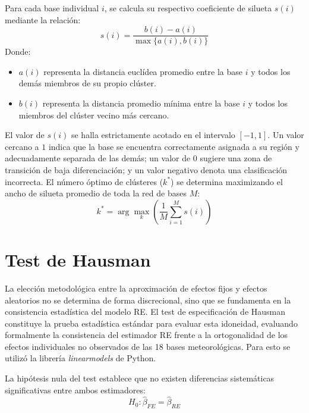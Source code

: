Para cada base individual $i$, se calcula su respectivo coeficiente de silueta $s(i)$ mediante la relación:
\begin{equation}
    s(i) = \frac{b(i) - a(i)}{\max\{a(i), b(i)\}}
    \label{eq:silueta}
\end{equation}
Donde:
\begin{itemize}
    \item $a(i)$ representa la distancia euclídea promedio entre la base $i$ y todos los demás miembros de su propio clúster.
    \item $b(i)$ representa la distancia promedio mínima entre la base $i$ y todos los miembros del clúster vecino más cercano.
\end{itemize}

El valor de $s(i)$ se halla estrictamente acotado en el intervalo $[-1, 1]$. Un valor cercano a $1$ indica que la base se encuentra correctamente asignada a su región y adecuadamente separada de las demás; un valor de $0$ sugiere una zona de transición de baja diferenciación; y un valor negativo denota una clasificación incorrecta. El número óptimo de clústeres ($k^*$) se determina maximizando el ancho de silueta promedio de toda la red de bases $M$:
\begin{equation}
    k^* = \arg\max_{k} \left( \frac{1}{M} \sum_{i=1}^{M} s(i) \right)
    \label{eq:siluetamax}
\end{equation}

\section{Test de Hausman}\label{sec:modelo_estadistico}

La elección metodológica entre la aproximación de efectos fijos y efectos aleatorios no se determina de forma discrecional, sino que se fundamenta en la consistencia estadística del modelo RE. El test de especificación de Hausman \cite{hausman1978} constituye la prueba estadística estándar para evaluar esta idoneidad, evaluando formalmente la consistencia del estimador RE frente a la ortogonalidad de los efectos individuales no observados de las 18 bases meteorológicas. Para esto se utilizó la librería \textit{linearmodels} de Python.

La hipótesis nula del test establece que no existen diferencias sistemáticas significativas entre ambos estimadores:
\begin{equation}
    H_0: \hat{\beta}_{FE} = \hat{\beta}_{RE}
\end{equation}


